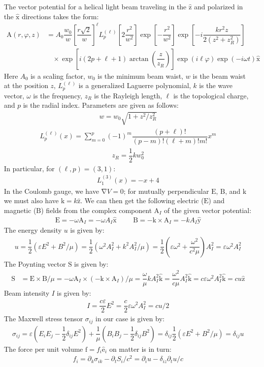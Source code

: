 \documentclass[10pt]{article}
\newcommand{\f}[2]{\dfrac{#1}{#2}} %
\newcommand{\p}[1]{\left(#1\right)} %
\renewcommand{\sp}[1]{\left[#1\right]} %
\renewcommand{\epsilon}{\varepsilon} %
\renewcommand{\phi}{\varphi} %
\renewcommand{\v}[1]{\boldsymbol{\mathrm{#1}}} %
\newcommand{\uv}[1]{\hat{\boldsymbol{\mathrm{#1}}}} %
\newcommand{\del}{\v\nabla} %
\renewcommand{\d}{\partial} %
\begin{document}
The vector potential for a helical light beam traveling in the $\uv z$
and polarized in the $\uv x$ directions takes the form:
\begin{align*}
  \v A\p{r,\phi,z}&=A_0\f{w_0}{w}\sp{\f{r\sqrt 2}{w}}^\ell
  L^{\p{\ell}}_p\sp{2\f{r^2}{w^2}}\exp\sp{-\f{r^2}{w^2}}
  \exp\sp{-i\f{kr^2z}{2\p{z^2+z_R^2}}} \\
  &~~~~\times\exp\sp{i\p{2p+\ell+1}\arctan\p{\f z{z_R}}}
  \exp\p{i\ell\phi}\exp\p{-i\omega t} \uv x
\end{align*}
Here $A_0$ is a scaling factor, $w_0$ is the minimum beam waist, $w$
is the beam waist at the position $z$, $L^{\p{\ell}}_p$ is a
generalized Laguerre polynomial, $k$ is the wave vector, $\omega$ is
the frequency, $z_R$ is the Rayleigh length, $\ell$ is the topological
charge, and $p$ is the radial index. Parameters are given as follows:
\begin{align*}
  w=w_0\sqrt{1+z^2/z_R^2}
\end{align*}
\begin{align*}
  L^{\p{\ell}}_p\p{x}
  =\sum_{m=0}^p\p{-1}^m\f{\p{p+\ell}!}{\p{p-m}!\p{\ell+m}!m!}x^m
\end{align*}
\begin{align*}
  z_R=\f12 kw_0^2
\end{align*}
In particular, for $\p{\ell,p}=\p{3,1}$:
\begin{align*}
  L^{\p{3}}_1\p{x}=-x+4
\end{align*}
In the Coulomb gauge, we have $\del V=0$; for mutually perpendicular
$\v E$, $\v B$, and $\v k$ we must also have $\v k=k\uv z$. We can
then get the following electric ($\v E$) and magnetic ($\v B$) fields
from the complex component $\v A_I$ of the given vector potential:
\begin{align*}
  \v E=-\omega\v A_I=-\omega A_I\uv x &&& \v B=-\v k\times\v
  A_I=-kA_I\uv y
\end{align*}
The energy density $u$ is given by:
\begin{align*}
  u=\f12\p{\epsilon E^2+B^2/\mu} =\f12\p{\omega^2A_I^2+k^2A_I^2/\mu}
  =\f12\p{\epsilon\omega^2+\f{\omega^2}{c^2\mu}}A_I^2
  =\epsilon\omega^2A_I^2
\end{align*}
The Poynting vector $\v S$ is given by:
\begin{align*}
  \v S&=\v E\times\v B/\mu =-\omega\v A_I\times\p{-\v k\times\v
    A_I}/\mu =\f\omega\mu kA_I^2\uv k =\f{\omega^2}{c\mu}A_I^2\uv k
  =c\epsilon\omega^2A_I^2\uv k =cu\uv z
\end{align*}
Beam intensity $I$ is given by:
\begin{align*}
  I=\f{c\epsilon}2E^2=\f c2\epsilon\omega^2A_I^2=cu/2
\end{align*}
The Maxwell stress tensor $\sigma_{ij}$ in our case is given by:
\begin{align*}
  \sigma_{ij}=\epsilon\p{E_iE_j-\f12\delta_{ij}E^2}
  +\f1\mu\p{B_iB_j-\f12\delta_{ij}B^2} =\delta_{ij}\f12\p{\epsilon
    E^2+B^2/\mu}=\delta_{ij}u
\end{align*}
The force per unit volume $\v f=f_i\uv e_i$ on matter is in turn:
\begin{align*}
  f_i=\d_k\sigma_{ik}-\d_tS_i/c^2=\d_iu-\delta_{iz}\d_tu/c
\end{align*}
\end{document}
